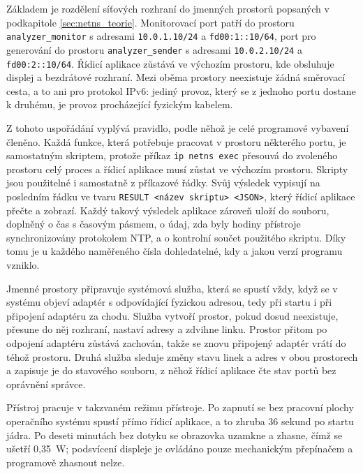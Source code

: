 Základem je rozdělení síťových rozhraní do jmenných prostorů popsaných v podkapitole \ref{sec:netns_teorie}. Monitorovací port patří do prostoru \texttt{analyzer\_\allowbreak monitor} s adresami \texttt{10.0.1.10/24} a \texttt{fd00:1::10/64}, port pro generování do prostoru \texttt{analyzer\_\allowbreak sender} s adresami \texttt{10.0.2.10/24} a \texttt{fd00:2::10/64}. Řídicí aplikace zůstává ve výchozím prostoru, kde obsluhuje displej a bezdrátové rozhraní. Mezi oběma prostory neexistuje žádná směrovací cesta, a to ani pro protokol IPv6: jediný provoz, který se z jednoho portu dostane k druhému, je provoz procházející fyzickým kabelem.

Z tohoto uspořádání vyplývá pravidlo, podle něhož je celé programové vybavení členěno. Každá funkce, která potřebuje pracovat v prostoru některého portu, je samostatným skriptem, protože příkaz \texttt{ip netns exec} přesouvá do zvoleného prostoru celý proces a řídicí aplikace musí zůstat ve výchozím prostoru. Skripty jsou použitelné i samostatně z příkazové řádky. Svůj výsledek vypisují na posledním řádku ve tvaru \texttt{RESULT <název skriptu> <JSON>}, který řídicí aplikace přečte a zobrazí. Každý takový výsledek aplikace zároveň uloží do souboru, doplněný o čas s časovým pásmem, o údaj, zda byly hodiny přístroje synchronizovány protokolem NTP, a o kontrolní součet použitého skriptu. Díky tomu je u každého naměřeného čísla dohledatelné, kdy a jakou verzí programu vzniklo.

Jmenné prostory připravuje systémová služba, která se spustí vždy, když se v systému objeví adaptér s odpovídající fyzickou adresou, tedy při startu i při připojení adaptéru za chodu. Služba vytvoří prostor, pokud dosud neexistuje, přesune do něj rozhraní, nastaví adresy a zdvihne linku. Prostor přitom po odpojení adaptéru zůstává zachován, takže se znovu připojený adaptér vrátí do téhož prostoru. Druhá služba sleduje změny stavu linek a adres v obou prostorech a zapisuje je do stavového souboru, z něhož řídicí aplikace čte stav portů bez oprávnění správce.

Přístroj pracuje v takzvaném režimu přístroje. Po zapnutí se bez pracovní plochy operačního systému spustí přímo řídicí aplikace, a to zhruba 36 sekund po startu jádra. Po deseti minutách bez dotyku se obrazovka uzamkne a zhasne, čímž se ušetří 0,35~W; podsvícení displeje je ovládáno pouze mechanickým přepínačem a programově zhasnout nelze.

